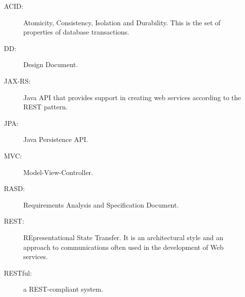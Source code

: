 \begin{description}
\item[ACID:] Atomicity, Consistency, Isolation and Durability. This is the set of properties of database transactions. 
\item[DD:] Design Document.
\item[JAX-RS:] Java API that provides support in creating web services according to the REST pattern.
\item[JPA:] Java Persistence API.
\item[MVC:] Model-View-Controller.
\item[RASD:] Requirements Analysis and Specification Document.
\item[REST:] REpresentational State Transfer. It is an architectural style and an approach to communications often used in the development of Web services.
\item[RESTful:] a REST-compliant system.
\end{description}